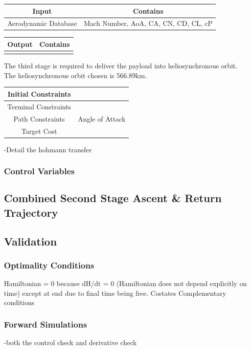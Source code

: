 \begin{tabular}{|c|c|}
	\hline Input  & Contains\\ 
	\hline Aerodynamic Database  & Mach Number, AoA, CA, CN, CD, CL, cP\\ 
	\hline 
\end{tabular} 

\begin{tabular}{|c|c|}
	\hline Output  & Contains\\ 
	\hline   & \\ 
	\hline 
\end{tabular} 

The third stage is required to deliver the payload into heliosynchronous orbit. The heliosynchronous orbit chosen is 566.89km. 

\begin{tabular}{|c|c|}
	\hline Initial Constraints  & \\ 
	\hline Terminal Constraints &  \\ 
	\hline Path Constraints & Angle of Attack \\ 
	\hline Target Cost &  \\ 
	\hline 
\end{tabular} 


-Detail the hohmann transfer
\subsubsection{Control Variables}

\subsection{Combined Second Stage Ascent \& Return  Trajectory}

\subsection{Validation}
\subsubsection{Optimality Conditions}
Hamiltonian = 0 because dH/dt = 0 (Hamiltonian does not depend explicitly on time) except at end due to final time being free.
Costates
Complementary conditions
\subsubsection{Forward Simulations}
-both the control check and derivative check
